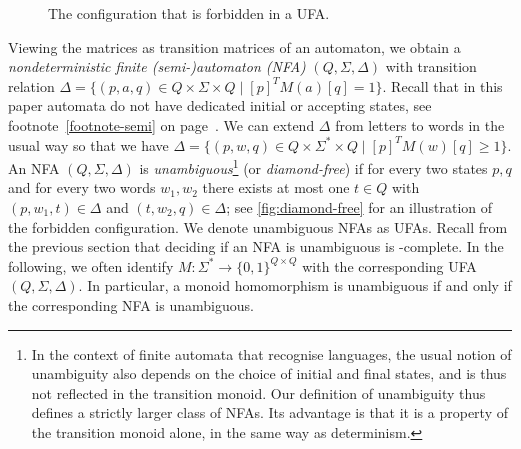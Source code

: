\begin{figure}[h]\centering
{}
\caption{The configuration that is forbidden in a UFA.}\label{fig:diamond-free}
\end{figure}

\noindent
Viewing the matrices as transition matrices of an automaton, we obtain a \emph{nondeterministic finite (semi-)automaton (NFA)} $(Q, \Sigma, \Delta)$ with transition relation $\Delta = \{(p,a,q) \in Q \times \Sigma \times Q \mid [p]^T M(a) [q] = 1\}$.
Recall that in this paper automata do not have dedicated initial or accepting states, see footnote~\ref{footnote-semi} on page~\pageref{footnote-semi}.
We can extend $\Delta$ from letters to words in the usual way so that we have $\Delta = \{(p,w,q) \in Q \times \Sigma^* \times Q \mid [p]^T M(w) [q] \ge 1\}$.
An NFA $(Q, \Sigma, \Delta)$ is \emph{unambiguous}\footnote{In the context of finite automata that recognise languages, the usual notion of unambiguity also depends on the choice of initial and final states, and is thus not reflected in the transition monoid. Our definition of unambiguity thus defines a strictly larger class of NFAs. Its advantage is that it is a property of the transition monoid alone, in the same way as determinism.} (or \emph{diamond-free}) if for every two states $p,q$ and for every two words $w_1, w_2$ there exists at most one $t \in Q$ with $(p,w_1,t) \in \Delta$ and $(t,w_2,q) \in \Delta$; see \autoref{fig:diamond-free} for an illustration of the forbidden configuration. We denote unambiguous NFAs as UFAs. Recall from the previous section that deciding if an NFA is unambiguous is \NL-complete. In the following, we often identify $M \colon \Sigma^* \to \{0,1\}^{Q \times Q}$ with the corresponding UFA $(Q, \Sigma, \Delta)$. In particular, a monoid homomorphism is unambiguous if and only if the corresponding NFA is unambiguous.


